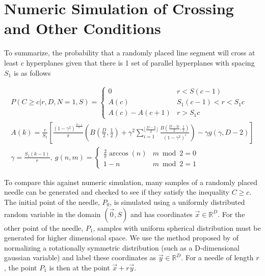 \documentclass{article}
\begin{document}


\section{Numeric Simulation of Crossing and Other Conditions} \label{s:n=1 numeric}
To summarize, the probability that a randomly placed line segment will cross at least $c$
hyperplanes given that there is 1 set of parallel hyperplanes with spacing $S_1$ is as follows

\begin{gather}
	P(C\ge c | r, D, N=1, S) = \begin{cases}
		0 & r < S(c-1) \\ 
		A(c)  & S_1 (c-1) < r < S_1 c \\
		A(c) - A(c+1) & r > S_1c		
	\end{cases} \\
	A(k) = \frac{r}{S_1} \left[\frac{(1-\gamma^2)^{\frac{D-1}{2}}}{\pi} \left(B\left(\frac{D}{2}, \frac{1}{2} \right) + \gamma^2 \sum_{i=1}^{\lfloor \frac{D-2}{2} \rfloor}\frac{B(\frac{D-2i}{2}, \frac{1}{2})}{(1-\gamma^2)^i}\right) - \gamma g(\gamma, D-2) \right] \\
	\gamma = \frac{S_1(k-1)}{r},\ g(n, m) = \begin{cases}
		\frac{2}{\pi}\arccos(n) & m\bmod 2 = 0 \\
		1-n & m \bmod 2 = 1
	\end{cases}
\end{gather}

To compare this against numeric simulation, many samples of a randomly placed needle can be generated and checked to
see if they satisfy the inequality $C\ge c$.
The initial point of the needle, $P_0$, is simulated using a uniformly distributed random variable in 
the domain $(\vec 0, S)$ and has coordinates $\vec x \in \mathbb{R}^D$. For the other point of the needle, $P_1$, samples 
with uniform spherical distribution must be generated for higher dimensional space. We use the method
proposed by \citet{marsaglia72} of normalizing a rotationally symmetric distribution 
(such as a D-dimensional gaussian variable) and label these coordinates as $\vec y \in \mathbb{R}^D$. For a needle of
length $r$, the point $P_1$ is then at the point $\vec x + r \vec y$.
\end{document}
